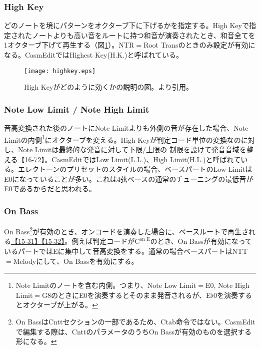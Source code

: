 \documentclass[uplatex, 10pt, dvipdfmx]{jsarticle}
\numberwithin{equation}{section}
\begin{document}
\subsubsection{High Key}

どのノートを境にパターンをオクターブ下に下げるかを指定する。High Keyで指定されたノートよりも高い音をルートに持つ和音が演奏されたとき、和音全てを1オクターブ下げて再生する（図\ref{fighighkey}）。NTR$=$Root Transのときのみ設定が有効になる。CasmEditではHighest Key(H.K.)と呼ばれている。

\begin{figure}[h]
  \centering
  \texttt{[image: highkey.eps]}
  \caption{High Keyがどのように効くかの説明の図。\cite{PSR}より引用。}
  \label{fighighkey}
\end{figure}

\subsubsection{Note Low Limit / Note High Limit}

音高変換された後のノートにNote Limitよりも外側の音が存在した場合、Note Limitの内側\footnote{Note Limitのノートを含む内側。つまり、Note Low Limit$=$E0, Note High Limit$=$G8のときにE0を演奏するとそのまま発音されるが、E$\flat$0を演奏するとオクターブが上がる。}にオクターブを変える。High Keyが判定コード単位の変換なのに対し、Note Limitは最終的な発音に対して下限/上限の
制限を設けて発音音域を整える\href{http://els01stylefile.music.coocan.jp/Stagea_Style/P1672.htm}{【16-72】}。CasmEditではLow Limit(L.L.)、High Limit(H.L.)と呼ばれている。エレクトーンのプリセットのスタイルの場合、ベースパートのLow LimitはE0になっていることが多い。これは4弦ベースの通常のチューニングの最低音がE0であるからだと思われる。

\subsubsection{On Bass}

On Bass\footnote{On BassはCnttセクションの一部であるため、Ctab命令ではない。CasmEditで編集する際は、CnttのパラメータのうちOn Bassが有効のものを選択する形になる。}が有効のとき、オンコードを演奏した場合に、ベースルートで再生される\href{http://els01stylefile.music.coocan.jp/Stagea_Style/P1531.htm}{【15-31】}\href{http://els01stylefile.music.coocan.jp/Stagea_Style/P1532.htm}{【15-32】}。例えば判定コードが$\textrm{C}^{\textrm{on E}}$のとき、On Bassが有効になっているパートではEに集中して音高変換をする。通常の場合ベースパートはNTT$=$Melodyにして、On Bassを有効にする。
\end{document}
